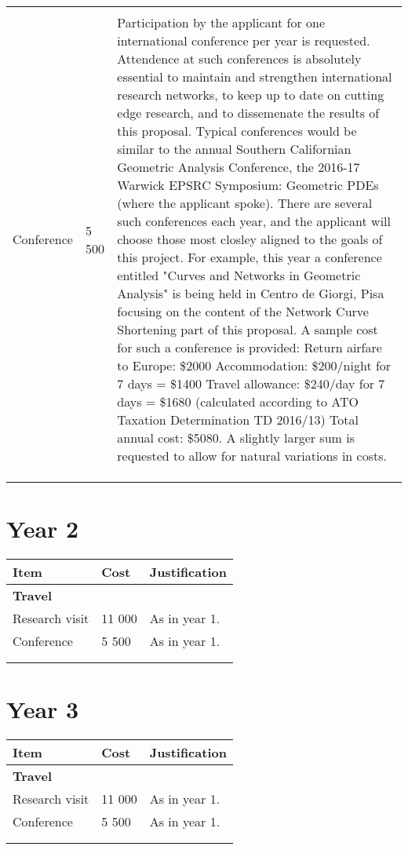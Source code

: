 \documentclass[12pt]{amsart}
\begin{document}
\begin{center}
\begin{longtable}{|p{}|p{}|p{}|}
 &  & \\
Conference & 5 500 & Participation by the applicant for one international conference per year is requested. Attendence at such conferences is absolutely essential to maintain and strengthen international research networks, to keep up to date on cutting edge research, and to dissemenate the results of this proposal. Typical conferences would be similar to the annual Southern Californian Geometric Analysis Conference, the 2016-17 Warwick EPSRC Symposium: Geometric PDEs (where the applicant spoke). There are several such conferences each year, and the applicant will choose those most closley aligned to the goals of this project. For example, this year a conference entitled "Curves and Networks in Geometric Analysis" is being held in Centro de Giorgi, Pisa focusing on the content of the Network Curve Shortening part of this proposal. A sample cost for such a conference is provided: Return airfare to Europe: \$2000 Accommodation: \$200/night for 7 days = \$1400 Travel allowance: \$240/day for 7 days = \$1680  (calculated according to ATO Taxation Determination TD 2016/13) Total annual cost: \$5080. A slightly larger sum is requested to allow for natural variations in costs.\\
 &  & \\
 &  & \\
&  & \\
\hline
\end{longtable}
\end{center}

\section*{Year 2}
\label{sec-2}
\begin{center}
\begin{tabular}{|l|l|l|}
\hline
Item & Cost & Justification\\
\hline
\textbf{Travel} &  & \\
Research visit & 11 000 & As in year 1.\\
Conference & 5 500 & As in year 1.\\
 &  & \\
 &  & \\
\hline
\end{tabular}
\end{center}

\section*{Year 3}
\label{sec-3}

\begin{center}
\begin{tabular}{|l|l|l|}
\hline
Item & Cost & Justification\\
\hline
\textbf{Travel} &  & \\
Research visit & 11 000 & As in year 1.\\
Conference & 5 500 & As in year 1.\\
 &  & \\
 &  & \\
\hline
\end{tabular}
\end{center}
\end{document}
